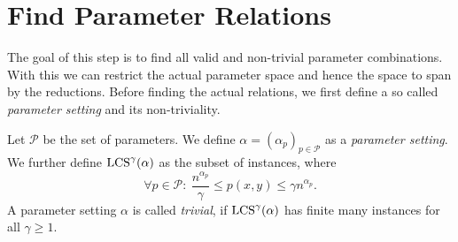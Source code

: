 \section{Find Parameter Relations}
\label{sec:fin_param_rels}
The goal of this step is to find all valid and non-trivial parameter combinations.
With this we can restrict the actual parameter space and hence the space to span by the reductions.
Before finding the actual relations, we first define a so called \emph{parameter setting} and its non-triviality.

\begin{definition}
Let $\mathcal{P}$ be the set of parameters.
We define $\mathbb{\alpha} = (\alpha_p)_{p \in \mathcal{P}}$ as a \emph{parameter setting}.
We further define $\text{LCS}^\gamma(\mathbb{\alpha})$ as the subset of \lcs{} instances, where %
\begin{displaymath}
	\forall p \in \mathcal{P}: \  \frac{n^{\alpha_p}}{\gamma} \leq p(x,y) \leq \gamma n^{\alpha_p}.
\end{displaymath}
A parameter setting $\mathbb{\alpha}$ is called \emph{trivial}, if $\text{LCS}^\gamma(\alpha)$ has finite many instances for all $\gamma \geq 1$.
\end{definition}
%


